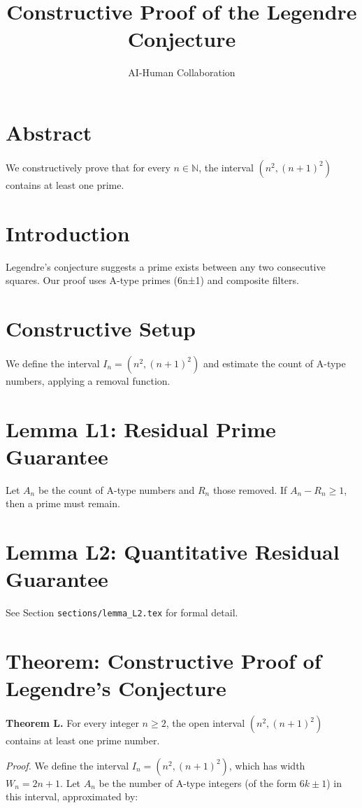 \documentclass{article}
\title{Constructive Proof of the Legendre Conjecture}
\author{AI-Human Collaboration}
\begin{document}
\maketitle

\section*{Abstract}
We constructively prove that for every \( n \in \mathbb{N} \), the interval \( (n^2, (n+1)^2) \) contains at least one prime.

\section{Introduction}
Legendre's conjecture suggests a prime exists between any two consecutive squares. Our proof uses A-type primes (6n±1) and composite filters.

\section{Constructive Setup}
We define the interval \( I_n = (n^2, (n+1)^2) \) and estimate the count of A-type numbers, applying a removal function.

\section{Lemma L1: Residual Prime Guarantee}
Let \( A_n \) be the count of A-type numbers and \( R_n \) those removed. If \( A_n - R_n \geq 1 \), then a prime must remain.

\section{Lemma L2: Quantitative Residual Guarantee}
See Section \texttt{sections/lemma\_L2.tex} for formal detail.

\section{Theorem: Constructive Proof of Legendre's Conjecture}

\textbf{Theorem L.}  
For every integer \( n \geq 2 \), the open interval \( (n^2, (n+1)^2) \) contains at least one prime number.

\textit{Proof.}  
We define the interval \( I_n = (n^2, (n+1)^2) \), which has width \( W_n = 2n + 1 \).  
Let \( A_n \) be the number of A-type integers (of the form \( 6k \pm 1 \)) in this interval, approximated by:
\end{document}
